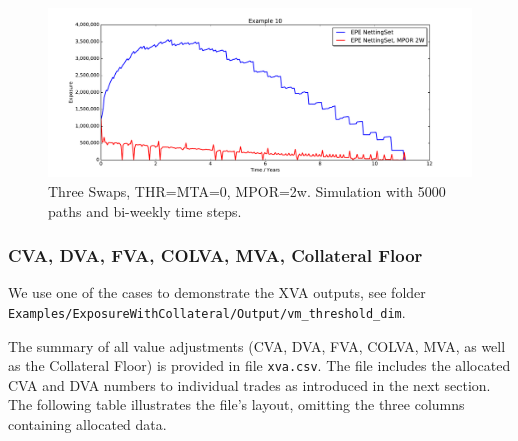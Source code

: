 \begin{figure}[h!]
\begin{center}
\includegraphics[scale=0.45]{examples/mpl_mpor_epe.pdf}
\end{center}
\caption{Three Swaps, THR=MTA=0, MPOR=2w. Simulation with 5000 paths and bi-weekly time steps.}
\label{fig_10}
\end{figure}


\subsubsection*{CVA, DVA, FVA, COLVA, MVA, Collateral Floor}

We use one of the cases to demonstrate the XVA outputs, see folder {\tt Examples/ExposureWithCollateral/Output/vm\_threshold\_dim}.

\medskip The summary of all value adjustments (CVA, DVA, FVA, COLVA, MVA, as well as the Collateral Floor) is provided
in file {\tt xva.csv}.  The file includes the allocated CVA and DVA numbers to individual trades as introduced in the
next section. The following table illustrates the file's layout, omitting the three columns containing allocated data.

\begin{center}
\end{center}

